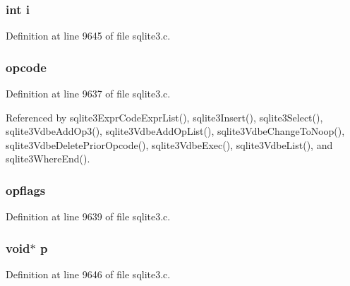 \subsubsection[{i}]{\setlength{\rightskip}{0pt plus 5cm}int i}\label{struct_vdbe_op_acb559820d9ca11295b4500f179ef6392}


Definition at line 9645 of file sqlite3.\+c.

\hypertarget{struct_vdbe_op_a2edfbd2b9bfd9c14b79dd26ffd02d88f}{}
\subsubsection[{opcode}]{ opcode}\label{struct_vdbe_op_a2edfbd2b9bfd9c14b79dd26ffd02d88f}


Definition at line 9637 of file sqlite3.\+c.



Referenced by sqlite3\+Expr\+Code\+Expr\+List(), sqlite3\+Insert(), sqlite3\+Select(), sqlite3\+Vdbe\+Add\+Op3(), sqlite3\+Vdbe\+Add\+Op\+List(), sqlite3\+Vdbe\+Change\+To\+Noop(), sqlite3\+Vdbe\+Delete\+Prior\+Opcode(), sqlite3\+Vdbe\+Exec(), sqlite3\+Vdbe\+List(), and sqlite3\+Where\+End().

\hypertarget{struct_vdbe_op_a42aec056f204bee9135be56eba3bf4ec}{}
\subsubsection[{opflags}]{ opflags}\label{struct_vdbe_op_a42aec056f204bee9135be56eba3bf4ec}


Definition at line 9639 of file sqlite3.\+c.

\hypertarget{struct_vdbe_op_a117104b82864d3b23ec174af6d392709}{}
\subsubsection[{p}]{\setlength{\rightskip}{0pt plus 5cm}void$\ast$ p}\label{struct_vdbe_op_a117104b82864d3b23ec174af6d392709}


Definition at line 9646 of file sqlite3.\+c.

\hypertarget{struct_vdbe_op_a8d5504470de9fec69f0389092910c500}{}
